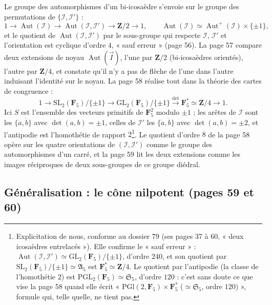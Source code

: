 \documentclass[11pt,a4paper]{article}
\begin{document}
Le groupe des automorphismes d'un bi-icosaèdre s'envoie sur le groupe des
permutations de $\{\mathcal{I}, \mathcal{I}'\}$ :
\[
  1 \to \operatorname{Aut}(\mathcal{I}) \to \operatorname{Aut}(\mathcal{I},
  \mathcal{I}') \to \mathbf{Z}/2 \to 1,\qquad
  \operatorname{Aut}(\mathcal{I}) \simeq \operatorname{Aut}^{+}(\mathcal{I})
  \times \{\pm 1\},
\]
et le quotient de $\operatorname{Aut}(\mathcal{I}, \mathcal{I}')$ par le
sous-groupe qui respecte $\mathcal{I}$, $\mathcal{I}'$ et l'orientation est
cyclique d'ordre $4$, « sauf erreur » (page 56). La page 57 compare deux
extensions de noyau $\operatorname{Aut}(\vec{I})$, l'une par $\mathbf{Z}/2$
(bi-icosaèdres orientés), l'autre par $\mathbf{Z}/4$, et constate qu'il n'y a
pas de flèche de l'une dans l'autre induisant l'identité sur le noyau. La page 58
réalise tout dans la théorie des cartes de congruence :
\[
  1 \to \mathrm{SL}_2(\mathbf{F}_5)/\{\pm 1\} \to \mathrm{GL}_2(\mathbf{F}_5)/\{\pm 1\}
  \xrightarrow{\det} \mathbf{F}_5^{*} \simeq \mathbf{Z}/4 \to 1 .
\]
Ici $S$ est l'ensemble des vecteurs primitifs de $\mathbf{F}_5^2$ modulo $\pm
1$ ; les arêtes de $\mathcal{I}$ sont les $\{\dot{a}, \dot{b}\}$ avec $\det(a, b)
= \pm 1$, celles de $\mathcal{I}'$ les $\{\dot a, \dot b\}$ avec $\det(a, b) =
\pm 2$, et l'antipodie est l'homothétie de rapport $2$\footnote{Explicitation
de nous, conforme au dossier 79 (ses pages 37 à 60, « deux icosaèdres
entrelacés »). Elle confirme le « sauf erreur » : $\operatorname{Aut}(\mathcal{I},
\mathcal{I}') \simeq \mathrm{GL}_2(\mathbf{F}_5)/\{\pm 1\}$, d'ordre $240$, et son
quotient par $\mathrm{SL}_2(\mathbf{F}_5)/\{\pm 1\} \simeq \mathfrak{A}_5$ est
$\mathbf{F}_5^{*} \simeq \mathbf{Z}/4$. Le quotient par l'antipodie (la classe
de l'homothétie $2$) est $\mathrm{PGL}_2(\mathbf{F}_5) \simeq \mathfrak{S}_5$,
d'ordre $120$ : c'est sans doute ce que vise la page 58 quand elle écrit
« $\mathrm{PGl}(2, \mathbf{F}_5) \times \mathbf{F}_5^{*}$ ($\simeq
\mathfrak{S}_5$, ordre $120$) », formule qui, telle quelle, ne tient pas.}.
Le quotient d'ordre $8$ de la page 58 opère sur les quatre orientations de
$(\mathcal{I}, \mathcal{I}')$ comme le groupe des automorphismes d'un carré, et
la page 59 lit les deux extensions comme les images réciproques de deux
sous-groupes de ce groupe diédral.

\subsection*{Généralisation : le cône nilpotent (pages 59 et 60)}
\end{document}
